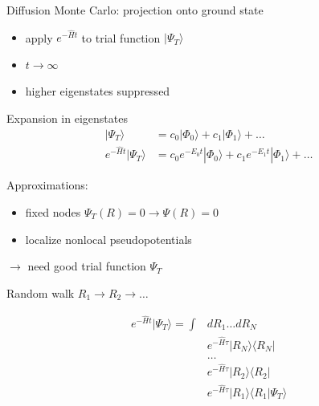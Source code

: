 \begin{frame}{Diffusion Monte Carlo: projection onto ground state}

\begin{minipage}[t]{.45\textwidth}
\vspace{-1em}
\begin{itemize}[leftmargin=0em]
\item apply $e^{-\hat{H}t}$ to trial function $|\Psi_T\rangle$
\item $t\rightarrow\infty$
\item higher eigenstates suppressed
\end{itemize}

\pagehline

Expansion in eigenstates
\vspace{-1ex}
\begin{align*}
|\Psi_T\rangle &= c_0 |\Phi_0\rangle + c_1 |\Phi_1\rangle + \ldots \\
e^{-\hat{H}t}|\Psi_T\rangle &= c_0 e^{-E_0t}|\Phi_0\rangle + c_1  e^{-E_1t}|\Phi_1\rangle + \ldots
\end{align*}

\pagehline

Approximations:

\begin{itemize}[leftmargin=1em]
\item fixed nodes $\Psi_T(R) = 0 \rightarrow \Psi(R) = 0$
\item localize nonlocal pseudopotentials
\end{itemize}
$\rightarrow$ need good trial function $\Psi_T$
\end{minipage}
\begin{minipage}[t]{.45\textwidth}
Random walk $R_1 \rightarrow R_2 \rightarrow \ldots$

\begin{align*}
e^{-\hat{H}t}|\Psi_T\rangle = \int & dR_1 \ldots dR_N
\\& e^{-\hat{H}\tau}|R_N\rangle\langle R_N|
\\&\ldots
\\& e^{-\hat{H}\tau}|R_2\rangle\langle R_2|
\\& e^{-\hat{H}\tau}|R_1\rangle\langle R_1|\Psi_T\rangle 
\end{align*}


\end{minipage}

\end{frame}





